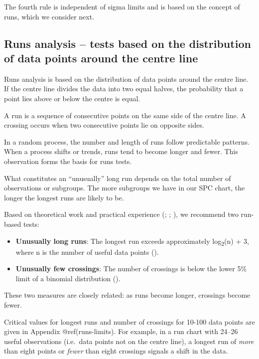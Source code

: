 \documentclass[
]{book}
\begin{document}
The fourth rule is independent of sigma limits and is based on the
concept of runs, which we consider next.

\subsection{Runs analysis -- tests based on the distribution of data
points around the centre
line}\label{runs-analysis-tests-based-on-the-distribution-of-data-points-around-the-centre-line}

Runs analysis is based on the distribution of data points around the
centre line. If the centre line divides the data into two equal halves,
the probability that a point lies above or below the centre is equal.

A run is a sequence of consecutive points on the same side of the centre
line. A crossing occurs when two consecutive points lie on opposite
sides.

In a random process, the number and length of runs follow predictable
patterns. When a process shifts or trends, runs tend to become longer
and fewer. This observation forms the basis for runs tests.

What constitutes an ``unusually'' long run depends on the total number
of observations or subgroups. The more subgroups we have in our SPC
chart, the longer the longest runs are likely to be.

Based on theoretical work and practical experience
(;
; ), we recommend two run-based tests:

\begin{itemize}
\item
  \textbf{Unusually long runs}: The longest run exceeds approximately
  log\textsubscript{2}(n) + 3, where n is the number of useful data
  points ().
\item
  \textbf{Unusually few crossings}: The number of crossings is below the
  lower 5\% limit of a binomial distribution
  ().
\end{itemize}

These two measures are closely related: as runs become longer, crossings
become fewer.

Critical values for longest runs and number of crossings for 10-100 data
points are given in Appendix @ref(runs-limits). For example, in a run
chart with 24--26 useful observations (i.e.~data points not on the
centre line), a longest run of \emph{more} than eight points or
\emph{fewer} than eight crossings signals a shift in the data.
\end{document}
